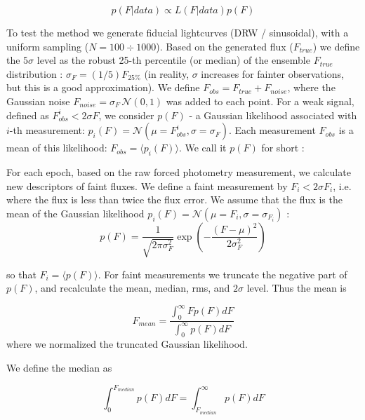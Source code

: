 \documentclass[fleqn,usenatbib]{mnras}  %
\begin{document}
\begin{equation}
p(F|data) \propto L(F|data) p(F)
\end{equation}


%
%

To test the method we generate fiducial lightcurves (DRW / sinusoidal), with a uniform sampling ($N=100\div1000$). Based on the generated flux ($F_{true}$) we define the $5\sigma$ level as the robust 25-th percentile (or median) of the ensemble $F_{true}$ distribution :  $\sigma_{F} = (1/5)  F_{25 \%}$ (in reality, $\sigma$ increases for fainter observations, but this is a good approximation). 
\newline
We define $F_{obs} = F_{true} + F_{noise}$, where the Gaussian noise $F_{noise} = \sigma_{F}  \, \mathcal{N}(0,1)$ was added to each point. 
For a weak signal, defined as $F_{obs}^{i} < 2 \sigma{F}$, we consider $p(F)$  - a  Gaussian  likelihood associated with $i$-th measurement: $p_{i}(F) = \mathcal{N}(\mu=F_{obs}^{i}, \sigma=\sigma_{F})$. Each measurement $F_{obs}$ is a mean of this likelihood: $F_{obs} = \langle p_{i}(F) \rangle$. We call it $p(F)$  for short : 



For each epoch, based on the raw forced photometry measurement, we calculate new descriptors of faint fluxes. We define a faint measurement by $F_{i} < 2 \sigma{F_{i}}$, i.e. where the flux is less than twice the flux error. We assume that the flux is the mean of the Gaussian likelihood  $p_{i}(F) = \mathcal{N}(\mu=F_{i}, \sigma=\sigma_{F_{i}})$ : 
\begin{equation}
p(F) = \frac{1}{\sqrt{2  \pi \sigma_{F}^{2}}} \exp{ \left(-\frac{(F-\mu)^{2}}{2\sigma_{F}^{2}}\right)}
\end{equation}

so that $F_{i} =\langle p(F) \rangle $.  For faint measurements we truncate the negative part of $p(F)$, and recalculate the mean, median, rms, and $2 \sigma$ level. Thus the mean is  


\begin{equation}
F_{mean} = \frac{\int _{0} ^ {\infty}{F p(F) dF}}{\int _{0} ^ {\infty}{p(F) dF}}
\end{equation} 
where we normalized the truncated Gaussian likelihood.
 
We define the median as  

\begin{equation}
\int _{0} ^ {F_{median}} {p(F) dF} = \int _{F_{median}} ^ {\infty} {p(F) dF}
\end{equation} 
\end{document}
